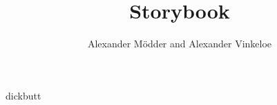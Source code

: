 \documentclass[english,10pt,a4paper]{article}
\title{Storybook}
\author{Alexander Mödder and Alexander Vinkeloe}
\newcommand{\Storybook}{./Storybook}
\begin{document}
\maketitle
dickbutt
\newpage
\tableofcontents
\newpage

\end{document}
